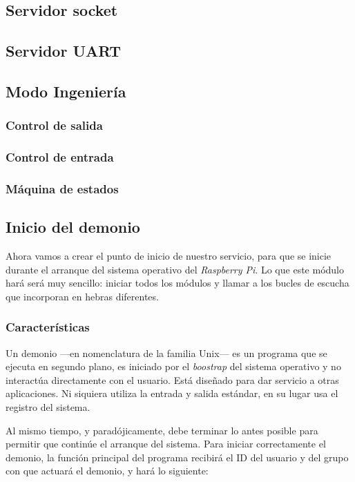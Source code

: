 \smallskip

\subsection{Servidor socket}



\subsection{Servidor UART}

\subsection{Modo Ingeniería}

\subsubsection{Control de salida}
\subsubsection{Control de entrada}
\subsubsection{Máquina de estados}

\subsection{Inicio del demonio}

Ahora vamos a crear el punto de inicio de nuestro servicio, para que se inicie durante el arranque del sistema operativo del \textit{Raspberry Pi}. Lo que este módulo hará será muy sencillo: iniciar todos los módulos y llamar a los bucles de escucha que incorporan en hebras diferentes.

\subsubsection{Características}

Un demonio ---en nomenclatura de la familia Unix--- es un programa que se ejecuta en segundo plano, es iniciado por el \textit{boostrap} del sistema operativo y no interactúa directamente con el usuario. Está diseñado para dar servicio a otras aplicaciones. Ni siquiera utiliza la entrada y salida estándar, en su lugar usa el registro del sistema.

Al mismo tiempo, y paradójicamente, debe terminar lo antes posible para permitir que continúe el arranque del sistema. Para iniciar correctamente el demonio, la función principal del programa recibirá el ID del usuario y del grupo con que actuará el demonio, y hará lo siguiente: \cite{shahmir_daemon}

